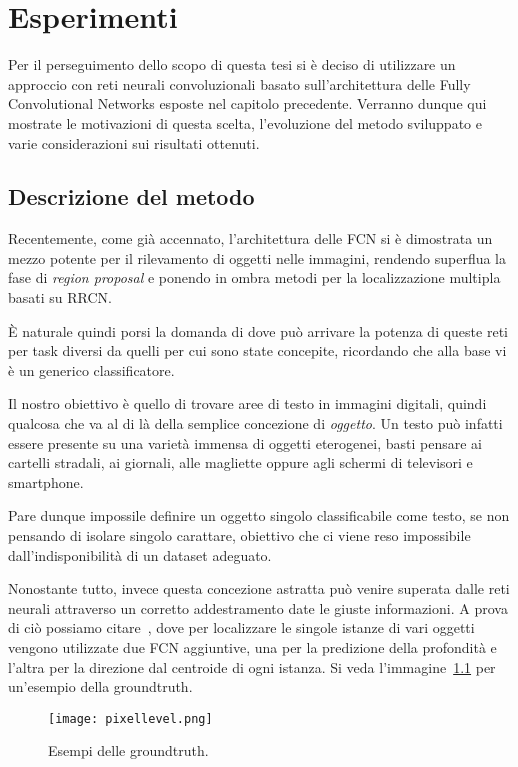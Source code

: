 \chapter{Esperimenti}

Per il perseguimento dello scopo di questa tesi si è deciso  di utilizzare un approccio con reti neurali convoluzionali basato sull'architettura delle Fully Convolutional Networks esposte nel capitolo precedente. Verranno dunque qui mostrate le motivazioni di questa scelta, l'evoluzione del metodo sviluppato e varie considerazioni sui risultati ottenuti.

\section{Descrizione del metodo}
Recentemente, come già accennato, l'architettura delle FCN si è dimostrata un mezzo potente per il rilevamento di oggetti nelle immagini, rendendo superflua la fase di \textit{region proposal} e ponendo in ombra metodi per la localizzazione multipla basati su RRCN.\par
È naturale quindi porsi la domanda di dove può arrivare la potenza di queste reti per task diversi da quelli per cui sono state concepite, ricordando che alla base vi è un generico classificatore.\par
Il nostro obiettivo è quello di trovare aree di testo in immagini digitali, quindi qualcosa che va al di là della semplice concezione di \textit{oggetto}. Un testo può infatti essere presente su una varietà immensa di oggetti eterogenei, basti pensare ai cartelli stradali, ai giornali, alle magliette oppure agli schermi di televisori e smartphone.\par
Pare dunque impossile definire un oggetto singolo classificabile come testo, se non pensando di isolare singolo carattare, obiettivo che ci viene reso impossibile dall'indisponibilità di un dataset adeguato.\par
Nonostante tutto, invece questa concezione astratta può venire superata dalle reti neurali attraverso un corretto addestramento date le giuste informazioni. A prova di ciò possiamo citare~\cite{pixellevel}, dove per localizzare le singole istanze di vari oggetti vengono utilizzate due FCN aggiuntive, una per la predizione della profondità e l'altra per la direzione dal centroide di ogni istanza. Si veda l'immagine~\ref{fig:pixellevel} per un'esempio della groundtruth.

\begin{figure}[H]
	\centering
	\texttt{[image: pixellevel.png]}
	\caption{Esempi delle groundtruth.}
\label{fig:pixellevel}
\end{figure}

